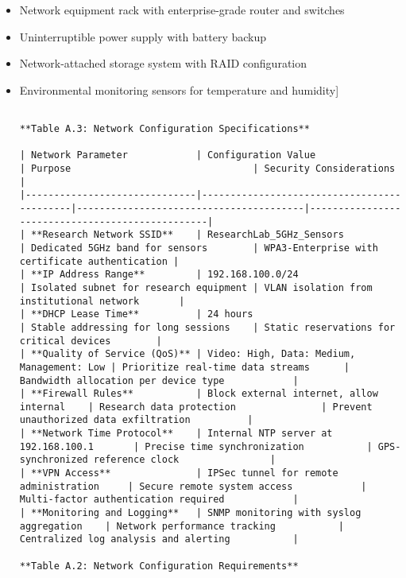 \documentclass[11pt,a4paper]{report}
\begin{document}
\begin{itemize}
\item Network equipment rack with enterprise-grade router and switches
\item Uninterruptible power supply with battery backup
\item Network-attached storage system with RAID configuration
\item Environmental monitoring sensors for temperature and humidity]
\begin{verbatim}

**Table A.3: Network Configuration Specifications**

| Network Parameter            | Configuration Value                        | Purpose                                | Security Considerations                         |
|------------------------------|--------------------------------------------|----------------------------------------|-------------------------------------------------|
| **Research Network SSID**    | ResearchLab_5GHz_Sensors                   | Dedicated 5GHz band for sensors        | WPA3-Enterprise with certificate authentication |
| **IP Address Range**         | 192.168.100.0/24                           | Isolated subnet for research equipment | VLAN isolation from institutional network       |
| **DHCP Lease Time**          | 24 hours                                   | Stable addressing for long sessions    | Static reservations for critical devices        |
| **Quality of Service (QoS)** | Video: High, Data: Medium, Management: Low | Prioritize real-time data streams      | Bandwidth allocation per device type            |
| **Firewall Rules**           | Block external internet, allow internal    | Research data protection               | Prevent unauthorized data exfiltration          |
| **Network Time Protocol**    | Internal NTP server at 192.168.100.1       | Precise time synchronization           | GPS-synchronized reference clock                |
| **VPN Access**               | IPSec tunnel for remote administration     | Secure remote system access            | Multi-factor authentication required            |
| **Monitoring and Logging**   | SNMP monitoring with syslog aggregation    | Network performance tracking           | Centralized log analysis and alerting           |

**Table A.2: Network Configuration Requirements**


\end{verbatim}
\end{itemize}
\end{document}
